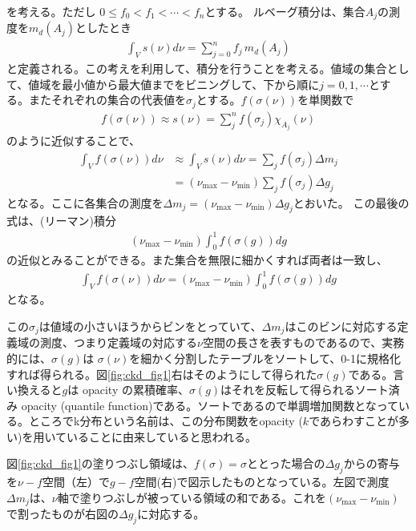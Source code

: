 を考える。ただし $0 \leq f_0 < f_1 < \cdots < f_n$とする。 ルベーグ積分は、集合$A_j$の測度を$m_d (A_j)$としたとき
\begin{align}
    \int_V s(\nu) d \nu = \sum_{j=0}^n f_j \, m_d (A_j)
\end{align}
と定義される。この考えを利用して、積分を行うことを考える。値域の集合として、値域を最小値から最大値までをビニングして、下から順に$j=0,1,\cdots$とする。またそれぞれの集合の代表値を$\sigma_j$とする。$f(\sigma(\nu))$を単関数で
\begin{align}
    f(\sigma(\nu)) \approx s(\nu) = \sum_j^n f(\sigma_j) \chi_{A_j}(\nu)
\end{align}
のように近似することで、
\begin{align}
 \int_V f(\sigma(\nu)) d \nu &\approx \int_V s(\nu) d \nu = \sum_j f(\sigma_j) \Delta m_j \\
 &= (\nu_\mathrm{max} - \nu_\mathrm{min}) \sum_j f(\sigma_j) \Delta g_j 
\end{align}
となる。ここに各集合の測度を$\Delta m_j = (\nu_\mathrm{max} - \nu_\mathrm{min}) \Delta g_j$とおいた。
この最後の式は、(リーマン)積分
\begin{align}
(\nu_\mathrm{max} - \nu_\mathrm{min}) \int_0^1 f(\sigma(g)) dg 
\end{align}
の近似とみることができる。また集合を無限に細かくすれば両者は一致し、
\begin{align}
\label{eq:Lebesgue}
\int_V f(\sigma(\nu)) d \nu = (\nu_\mathrm{max} - \nu_\mathrm{min}) \int_0^1 f(\sigma(g)) dg 
\end{align}
となる。

この$\sigma_j$は値域の小さいほうからビンをとっていて、$\Delta m_j$はこのビンに対応する定義域の測度、つまり定義域の対応する$\nu$空間の長さを表すものであるので、実務的には、$\sigma(g)$は $\sigma(\nu)$を細かく分割したテーブルをソートして、0-1に規格化すれば得られる。図\ref{fig:ckd_fig1}右はそのようにして得られた$\sigma(g)$である。言い換えると$g$は opacity の累積確率、$\sigma (g)$はそれを反転して得られるソート済み opacity (quantile function)である。ソートであるので単調増加関数となっている。ところでk分布という名前は、この分布関数をopacity ($k$であらわすことが多い)を用いていることに由来していると思われる。

図\ref{fig:ckd_fig1}の塗りつぶし領域は、$f (\sigma) = \sigma$ととった場合の$\Delta g_j$からの寄与を$\nu-f$空間（左）で$g-f$空間(右)で図示したものとなっている。左図で測度$\Delta m_j$は、$\nu$軸で塗りつぶしが被っている領域の和である。これを$(\nu_\mathrm{max} - \nu_\mathrm{min})$で割ったものが右図の$\Delta g_j$に対応する。

